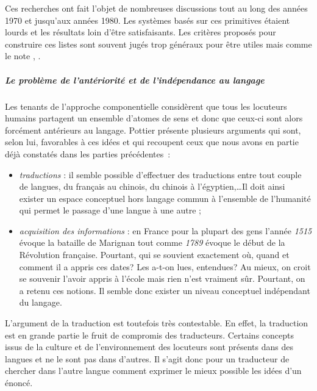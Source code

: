 {Ces recherches ont fait l'objet de nombreuses discussions tout au long
des années 1970 \cite{Winograd1978} et jusqu'aux années 1980. Les
systèmes basés sur ces primitives étaient lourds et les résultats loin
d'être satisfaisants.  Les critères proposés pour construire ces
listes sont souvent jugés trop généraux pour être utiles mais comme le
note \cite{Sabah1996}, .

\subparagraph{Le problème de l'antériorité et de l'indépendance au
  langage}\label{sec:pb-anter-langage}

Les tenants de l'approche componentielle considèrent que tous les
locuteurs humains partagent un ensemble d'atomes de sens et donc que
ceux-ci sont alors forcément antérieurs au langage. Pottier présente
plusieurs arguments qui sont, selon lui, favorables à ces idées et qui
recoupent ceux que nous avons en partie déjà constatés dans les
parties précédentes~:

\begin{itemize}
  
\item \emph{traductions} : il semble possible d'effectuer des
  traductions entre tout couple de langues, du français au chinois, du
  chinois à l'égyptien,\ldots Il doit ainsi exister un espace
  conceptuel hors langage commun à l'ensemble de l'humanité qui permet
  le passage d'une langue à une autre ;
  
\item \emph{acquisition des informations} : en France pour la plupart
  des gens l'année \emph{1515} évoque la bataille de Marignan tout
  comme \emph{1789} évoque le début de la Révolution française.
  Pourtant, qui se souvient exactement où, quand et comment il a
  appris ces dates? Les a-t-on lues, entendues? Au mieux, on croit se
  souvenir l'avoir appris à l'école mais rien n'est vraiment sûr.
  Pourtant, on a retenu ces notions. Il semble donc exister un niveau
  conceptuel indépendant du langage.

\end{itemize}

L'argument de la traduction est toutefois très contestable. En effet,
la traduction est en grande partie le fruit de compromis des
traducteurs.  Certains concepts issus de la culture et de
l'environnement des locuteurs sont présents dans des langues et ne le
sont pas dans d'autres. Il s'agit donc pour un traducteur de chercher
dans l'autre langue comment exprimer le mieux possible les idées d'un
énoncé.

}
